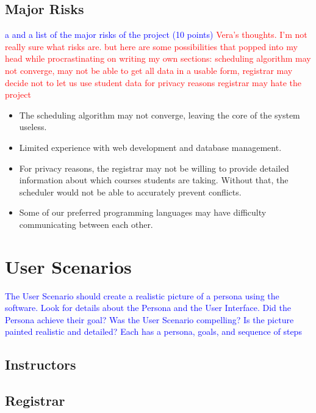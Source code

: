 \documentclass[11pt]{article}
\begin{document}
\subsection{Major Risks} %
\textcolor{blue}{a and a list of the major risks of the project (10 points)}
\textcolor{red}{Vera's thoughts. I'm not really sure what risks are. but here are some possibilities that popped into my head while procrastinating on writing my own sections:
scheduling algorithm may not converge,
may not be able to get all data in a usable form,
registrar may decide not to let us use student data for privacy reasons 
registrar may hate the project}
\begin{itemize}
  \item The scheduling algorithm may not converge, leaving the core of the system useless.
  \item Limited experience with web development and database management.
  \item For privacy reasons, the registrar may not be willing to provide detailed information about which courses students are taking. Without that, the scheduler would not be able to accurately prevent conflicts.
  \item Some of our preferred programming languages may have difficulty communicating between each other. %
\end{itemize}


\section{User Scenarios}  %
\textcolor{blue}{The User Scenario should create a realistic picture of a persona using the software.  
Look for details about the Persona and the User Interface.  
Did the Persona achieve their goal?  
Was the User Scenario compelling?  
Is the picture painted realistic and detailed?
Each has a persona, goals, and sequence of steps}
\subsection{Instructors} %
\subsection{Registrar}  %
\end{document}
